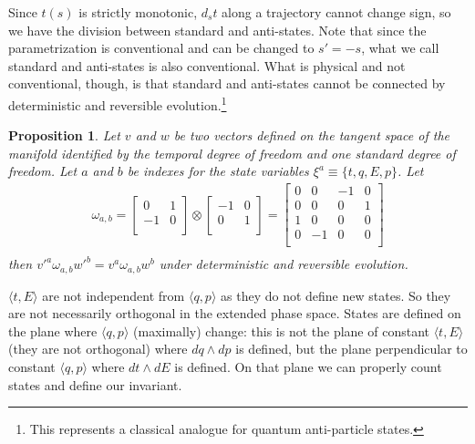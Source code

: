 \documentclass[aps,pra,10pt,twocolumn,floatfix,nofootinbib]{revtex4-1}
\newtheorem{prop}[thm]{Proposition}
\theoremstyle{definition}
\begin{document}
Since $t(s)$ is strictly monotonic, $d_{s}t$ along a trajectory cannot change sign, so we have the division between standard and anti-states. Note that since the parametrization is conventional and can be changed to $s'=-s$, what we call standard and anti-states is also conventional. What is physical and not conventional, though, is that standard and anti-states cannot be connected by deterministic and reversible evolution.\footnote{This represents a classical analogue for quantum anti-particle states.}

\begin{prop}\label{tdofInvariant}
Let $v$ and $w$ be two vectors defined on the tangent space of the manifold identified by the temporal degree of freedom and one standard degree of freedom. Let $a$ and $b$ be indexes for the state variables $\xi^a\equiv\{t, q, E, p\}$. Let
\begin{align*}
\omega_{a, b} =  \left[
  \begin{array}{cc}
    0 & 1 \\
    -1 & 0 \\
  \end{array}
\right] \otimes \left[
  \begin{array}{cc}
    -1 & 0 \\
    0 & 1 \\
  \end{array}
\right]
= \left[
  \begin{array}{cccc}
    0 & 0 & -1 & 0 \\
    0 & 0 & 0 & 1 \\
    1 & 0 & 0 & 0 \\
    0 & -1 & 0 & 0 \\
  \end{array}
\right] \\
\end{align*}
then $v'^{a} \omega_{a, b} w'^{b}=v^{a} \omega_{a, b} w^{b}$ under deterministic and reversible evolution.
\end{prop}

$\langle t, E \rangle$ are not independent from $\langle q, p \rangle$ as they do not define new states. So they are not necessarily orthogonal in the extended phase space. States are defined on the plane where $\langle q, p \rangle$ (maximally) change: this is not the plane of constant $\langle t, E \rangle$ (they are not orthogonal) where $dq \wedge dp$ is defined, but the plane perpendicular to constant $\langle q, p \rangle$ where $dt \wedge dE$ is defined. On that plane we can properly count states and define our invariant.
\end{document}
